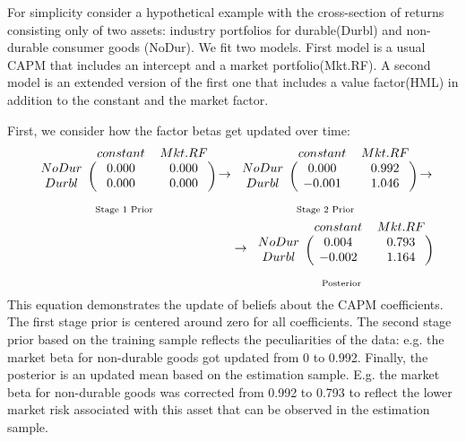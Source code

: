 For simplicity consider a hypothetical example with the cross-section of returns consisting only of  two assets: industry portfolios for durable(Durbl) and non-durable consumer goods (NoDur).
We fit two models.
First model is a usual CAPM that includes an intercept and a market portfolio(Mkt.RF). 
A second model is an extended version of the first one that includes a value factor(HML) in addition to the constant and the market factor. 

First, we consider how the factor betas get updated over time:
\begin{eqnarray*}
\underset{\text{Stage 1 Prior}}
{\begin{blockarray}{ccc}
	& constant & Mkt.RF  \\ 
	\begin{block}{c(cc)}
	NoDur & 0.000 & 0.000 \\ 
	Durbl & 0.000 & 0.000 \\ 
	\end{block}
\end{blockarray} }
\rightarrow
\underset{\text{Stage 2 Prior}}
{\begin{blockarray}{ccc}
	& constant & Mkt.RF \\ 
	\begin{block}{c(cc)}
	NoDur & 0.000 & 0.992 \\ 
	Durbl & -0.001 & 1.046 \\ 
	\end{block}
\end{blockarray} }
\rightarrow \\
\rightarrow
\underset{\text{Posterior}}
{\begin{blockarray}{ccc}
	& constant & Mkt.RF \\ 
	\begin{block}{c(cc)}
	NoDur & 0.004 & 0.793 \\ 
	Durbl & -0.002 & 1.164 \\ 
	\end{block}
\end{blockarray}}
\end{eqnarray*}
This equation demonstrates the update of beliefs about the CAPM coefficients.
The first stage prior is centered around zero for all coefficients. 
The second stage prior based on the training sample reflects the peculiarities of the data: e.g. the market beta for non-durable goods got updated from 0 to 0.992. 
Finally, the posterior is an updated mean based on the estimation sample. 
E.g. the market beta for non-durable goods was corrected from 0.992 to 0.793 to reflect the lower market risk associated with this asset that can be observed in the estimation sample.
